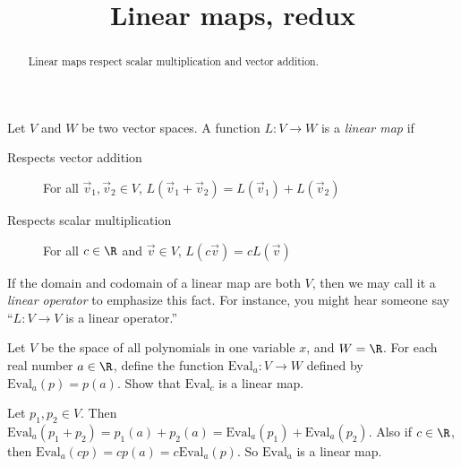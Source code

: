 \documentclass{ximera}
\title{Linear maps, redux}
\begin{document}
\begin{abstract}
  Linear maps respect scalar multiplication and vector addition.
\end{abstract}\maketitle

\begin{definition}
  Let $V$ and $W$ be two vector spaces.  A function $L: V \to W$ is a \textit{linear map} if 
  \begin{description}
  \item[Respects vector addition] For all $\vec{v}_1,\vec{v}_2 \in V$, $L(\vec{v}_1+\vec{v}_2) = L(\vec{v}_1)+L(\vec{v}_2)$
  \item[Respects scalar multiplication] For all $c \in \R$ and $\vec{v} \in V$, $L(c\vec{v}) = cL(\vec{v})$
  \end{description}
\end{definition}

If the domain and codomain of a linear map are both $V$, then we may
call it a \textit{linear operator} to emphasize this fact.  For
instance, you might hear someone say ``$L : V \to V$ is a linear
operator.''

Let $V$ be the space of all polynomials in one variable $x$, and $W =
\R$.  For each real number $a \in \R$, define the function $\text{Eval}_a: V
\to W$ defined by $\text{Eval}_a(p) = p(a)$.  Show that $\text{Eval}_c$ is a linear
map.

\begin{free-response}	
  Let $p_1, p_2 \in V$.  Then $\text{Eval}_a(p_1+p_2)  = p_1(a)+p_2(a) = \text{Eval}_a(p_1) + \text{Eval}_a(p_2)$.  Also if $c \in \R$, then $\text{Eval}_a(cp) = cp(a) = c\text{Eval}_a(p)$.  So $\text{Eval}_a$
  is a linear map.
\end{free-response}


\end{document}
